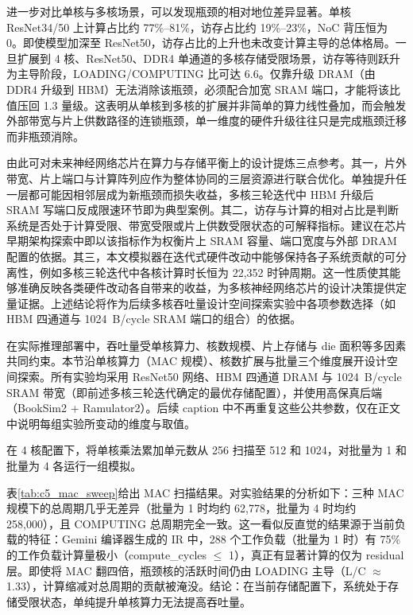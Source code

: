 进一步对比单核与多核场景，可以发现瓶颈的相对地位差异显著。单核 ResNet34/50 上计算占比约 77\%--81\%，访存占比约 19\%--23\%，NoC 背压恒为 0。即使模型加深至 ResNet50，访存占比的上升也未改变计算主导的总体格局。一旦扩展到 4 核、ResNet50、DDR4 单通道的多核存储受限场景，访存等待则跃升为主导阶段，LOADING\allowbreak /COMPUTING \allowbreak 比可达 6.6。仅靠升级 DRAM（由 DDR4 升级到 HBM）无法消除该瓶颈，必须配合加宽 SRAM 端口，才能将该比值压回 1.3 量级。这表明从单核到多核的扩展并非简单的算力线性叠加，而会触发外部带宽与片上供数路径的连锁瓶颈，单一维度的硬件升级往往只是完成瓶颈迁移而非瓶颈消除。

由此可对未来神经网络芯片在算力与存储平衡上的设计提炼三点参考。其一，片外带宽、片上端口与计算阵列应作为整体协同的三层资源进行联合优化。单独提升任一层都可能因相邻层成为新瓶颈而损失收益，多核三轮迭代中 HBM 升级后 SRAM 写端口反成限速环节即为典型案例。其二，访存与计算的相对占比是判断系统是否处于计算受限、带宽受限或片上供数受限状态的可解释指标。建议在芯片早期架构探索中即以该指标作为权衡片上 SRAM 容量、端口宽度与外部 DRAM 配置的依据。其三，本文模拟器在迭代式硬件改动中能够保持各子系统贡献的可分离性，例如多核三轮迭代中各核计算时长恒为 22,352 时钟周期。这一性质使其能够准确反映各类硬件改动各自带来的收益，为多核神经网络芯片的设计决策提供定量证据。上述结论将作为后续多核吞吐量设计空间探索实验中各项参数选择（如 HBM 四通道与 \SI{1024}{B/cycle} SRAM 端口的组合）的依据。

\label{sec:c4_dse}
\label{sec:c5_dse}

在实际推理部署中，吞吐量受单核算力、核数规模、片上存储与 die 面积等多因素共同约束。本节沿单核算力（MAC 规模）、核数扩展与批量三个维度展开设计空间探索。所有实验均采用 ResNet50 网络、HBM 四通道 DRAM 与 \SI{1024}{B/cycle} SRAM 带宽（即前述多核三轮迭代确定的最优存储配置），并使用高保真后端（BookSim2 + Ramulator2）。后续 caption 中不再重复这些公共参数，仅在正文中说明每组实验所变动的维度与取值。


在 4 核配置下，将单核乘法累加单元数从 256 扫描至 512 和 1024，对批量为 1 和批量为 4 各运行一组模拟。

表\ref{tab:c5_mac_sweep}给出 MAC 扫描结果。对实验结果的分析如下：三种 MAC 规模下的总周期几乎无差异（批量为 1 时均约 62,778，批量为 4 时均约 258,000），且 COMPUTING 总周期完全一致。这一看似反直觉的结果源于当前负载的特征：Gemini 编译器生成的 IR 中，288 个工作负载（批量为 1 时）有 75\% 的工作负载计算量极小（compute\_cycles $\leq$ 1），真正有显著计算的仅为 residual 层。即使将 MAC 翻四倍，瓶颈核的活跃时间仍由 LOADING 主导（L/C $\approx$ 1.33），计算缩减对总周期的贡献被淹没。结论：在当前存储配置下，系统处于存储受限状态，单纯提升单核算力无法提高吞吐量。

